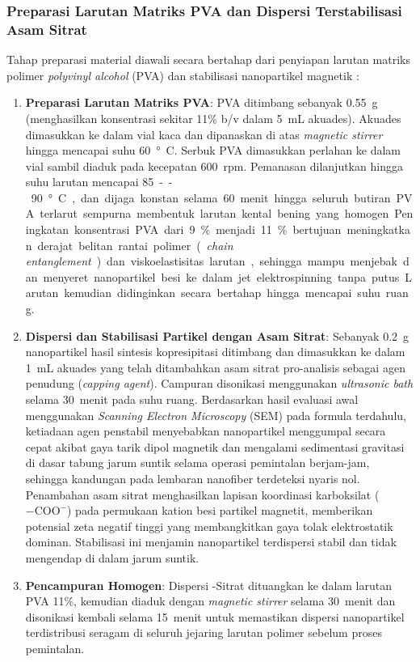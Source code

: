 \subsubsection{Preparasi Larutan Matriks PVA dan Dispersi \texorpdfstring{}{Fe3O4} Terstabilisasi Asam Sitrat}
Tahap preparasi material diawali secara bertahap dari penyiapan larutan matriks polimer \textit{polyvinyl alcohol} (PVA) dan stabilisasi nanopartikel magnetik :
\begin{enumerate}
    \item \textbf{Preparasi Larutan Matriks PVA}: PVA ditimbang sebanyak \SI{0.55}{g} (menghasilkan konsentrasi sekitar 11\% b/v dalam \SI{5}{mL} akuades). Akuades dimasukkan ke dalam vial kaca dan dipanaskan di atas \textit{magnetic stirrer} hingga mencapai suhu \SI{60}{\degree C}. Serbuk PVA dimasukkan perlahan ke dalam vial sambil diaduk pada kecepatan \SI{600}{rpm}. Pemanasan dilanjutkan hingga suhu larutan mencapai \SI{85}--\SI{90}{\degree C}, dan dijaga konstan selama \SI{60}{menit} hingga seluruh butiran PVA terlarut sempurna membentuk larutan kental bening yang homogen. Peningkatan konsentrasi PVA dari 9\% menjadi 11\% bertujuan meningkatkan derajat belitan rantai polimer (\textit{chain entanglement}) dan viskoelastisitas larutan, sehingga mampu menjebak dan menyeret nanopartikel besi ke dalam jet elektrospinning tanpa putus. Larutan kemudian didinginkan secara bertahap hingga mencapai suhu ruang.
    \item \textbf{Dispersi dan Stabilisasi Partikel  dengan Asam Sitrat}: Sebanyak \SI{0.2}{g} nanopartikel  hasil sintesis kopresipitasi ditimbang dan dimasukkan ke dalam \SI{1}{mL} akuades yang telah ditambahkan asam sitrat pro-analisis sebagai agen penudung (\textit{capping agent}). Campuran disonikasi menggunakan \textit{ultrasonic bath} selama \SI{30}{menit} pada suhu ruang. Berdasarkan hasil evaluasi awal menggunakan \textit{Scanning Electron Microscopy} (SEM) pada formula terdahulu, ketiadaan agen penstabil menyebabkan nanopartikel  menggumpal secara cepat akibat gaya tarik dipol magnetik dan mengalami sedimentasi gravitasi di dasar tabung jarum suntik selama operasi pemintalan berjam-jam, sehingga kandungan  pada lembaran nanofiber terdeteksi nyaris nol. Penambahan asam sitrat menghasilkan lapisan koordinasi karboksilat ($- \text{COO}^-$) pada permukaan kation besi partikel magnetit, memberikan potensial zeta negatif tinggi yang membangkitkan gaya tolak elektrostatik dominan. Stabilisasi ini menjamin nanopartikel  terdispersi stabil dan tidak mengendap di dalam jarum suntik.
    \item \textbf{Pencampuran Homogen}: Dispersi -Sitrat dituangkan ke dalam larutan PVA 11\%, kemudian diaduk dengan \textit{magnetic stirrer} selama \SI{30}{menit} dan disonikasi kembali selama \SI{15}{menit} untuk memastikan dispersi nanopartikel terdistribusi seragam di seluruh jejaring larutan polimer sebelum proses pemintalan.
\end{enumerate}

